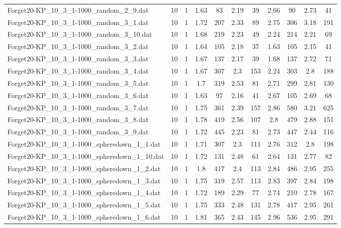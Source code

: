 \begin{table}[!ht]
\begin{tabular}{lcccccccccc}
Forget20-KP\_10\_3\_1-1000\_random\_2\_9.dat & 10 & 1 & 1.63 & 83 & 2.19 & 39 & 2.66 & 90 & 2.73 & 41 \\
Forget20-KP\_10\_3\_1-1000\_random\_3\_1.dat & 10 & 1 & 1.72 & 207 & 2.33 & 89 & 2.75 & 306 & 3.18 & 191 \\
Forget20-KP\_10\_3\_1-1000\_random\_3\_10.dat & 10 & 1 & 1.68 & 219 & 2.23 & 49 & 2.24 & 214 & 2.21 & 69 \\
Forget20-KP\_10\_3\_1-1000\_random\_3\_2.dat & 10 & 1 & 1.64 & 105 & 2.18 & 37 & 1.63 & 105 & 2.15 & 41 \\
Forget20-KP\_10\_3\_1-1000\_random\_3\_3.dat & 10 & 1 & 1.67 & 137 & 2.17 & 39 & 1.68 & 137 & 2.72 & 71 \\
Forget20-KP\_10\_3\_1-1000\_random\_3\_4.dat & 10 & 1 & 1.67 & 307 & 2.3 & 153 & 2.24 & 303 & 2.8 & 188 \\
Forget20-KP\_10\_3\_1-1000\_random\_3\_5.dat & 10 & 1 & 1.7 & 319 & 2.53 & 81 & 2.71 & 299 & 2.81 & 130 \\
Forget20-KP\_10\_3\_1-1000\_random\_3\_6.dat & 10 & 1 & 1.63 & 97 & 2.16 & 41 & 2.67 & 105 & 2.69 & 68 \\
Forget20-KP\_10\_3\_1-1000\_random\_3\_7.dat & 10 & 1 & 1.75 & 361 & 2.39 & 157 & 2.86 & 580 & 3.21 & 625 \\
Forget20-KP\_10\_3\_1-1000\_random\_3\_8.dat & 10 & 1 & 1.78 & 419 & 2.56 & 107 & 2.8 & 479 & 2.88 & 151 \\
Forget20-KP\_10\_3\_1-1000\_random\_3\_9.dat & 10 & 1 & 1.72 & 445 & 2.23 & 81 & 2.73 & 447 & 2.44 & 116 \\
Forget20-KP\_10\_3\_1-1000\_spheredown\_1\_1.dat & 10 & 1 & 1.71 & 307 & 2.3 & 111 & 2.76 & 312 & 2.8 & 198 \\
Forget20-KP\_10\_3\_1-1000\_spheredown\_1\_10.dat & 10 & 1 & 1.72 & 131 & 2.48 & 61 & 2.64 & 131 & 2.77 & 82 \\
Forget20-KP\_10\_3\_1-1000\_spheredown\_1\_2.dat & 10 & 1 & 1.8 & 417 & 2.4 & 113 & 2.84 & 486 & 2.95 & 255 \\
Forget20-KP\_10\_3\_1-1000\_spheredown\_1\_3.dat & 10 & 1 & 1.75 & 319 & 2.57 & 113 & 2.83 & 397 & 2.84 & 198 \\
Forget20-KP\_10\_3\_1-1000\_spheredown\_1\_4.dat & 10 & 1 & 1.72 & 189 & 2.29 & 77 & 2.74 & 210 & 2.78 & 167 \\
Forget20-KP\_10\_3\_1-1000\_spheredown\_1\_5.dat & 10 & 1 & 1.75 & 333 & 2.48 & 131 & 2.78 & 417 & 2.95 & 261 \\
Forget20-KP\_10\_3\_1-1000\_spheredown\_1\_6.dat & 10 & 1 & 1.81 & 365 & 2.43 & 145 & 2.96 & 536 & 2.95 & 291 \\

\end{tabular}
\end{table}
